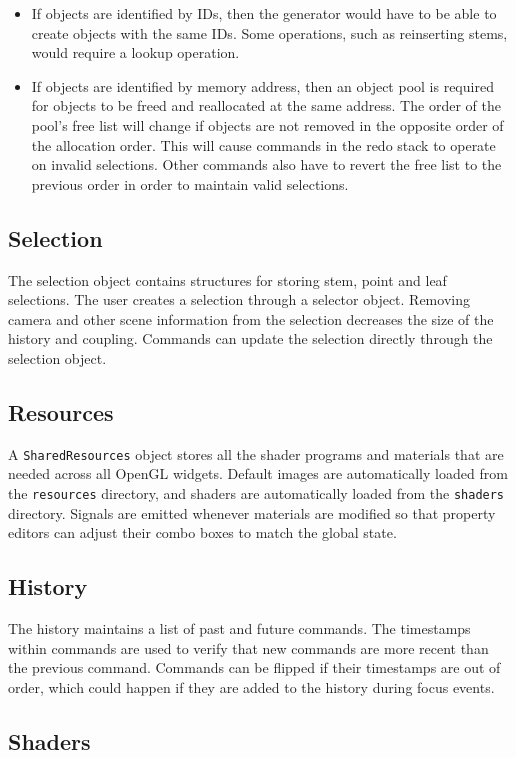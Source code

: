 \documentclass[10pt]{article}
\begin{document}
\begin{itemize}
\item If objects are identified by IDs, then the generator would have to be able to create objects with the same IDs. Some operations, such as reinserting stems, would require a lookup operation.
\item If objects are identified by memory address, then an object pool is required for objects to be freed and reallocated at the same address. The order of the pool's free list will change if objects are not removed in the opposite order of the allocation order. This will cause commands in the redo stack to operate on invalid selections. Other commands also have to revert the free list to the previous order in order to maintain valid selections.
\end{itemize}

\subsection{Selection}
The selection object contains structures for storing stem, point and leaf selections. The user creates a selection through a selector object. Removing camera and other scene information from the selection decreases the size of the history and coupling. Commands can update the selection directly through the selection object.

\subsection{Resources}
A \texttt{SharedResources} object stores all the shader programs and materials that are needed across all OpenGL widgets. Default images are automatically loaded from the \texttt{resources} directory, and shaders are automatically loaded from the \texttt{shaders} directory. Signals are emitted whenever materials are modified so that property editors can adjust their combo boxes to match the global state.

\subsection{History}
The history maintains a list of past and future commands. The timestamps within commands are used to verify that new commands are more recent than the previous command. Commands can be flipped if their timestamps are out of order, which could happen if they are added to the history during focus events.

\subsection{Shaders}
\end{document}
